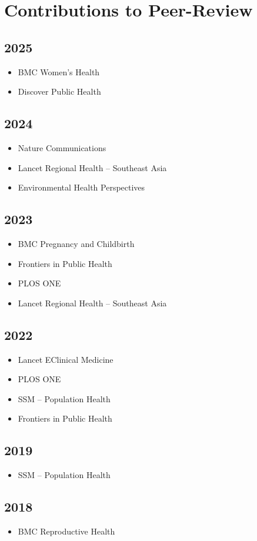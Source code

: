 \documentclass[13pt,letterpaper]{article}
\begin{document}
\section*{Contributions to Peer-Review}
\label{sec:org2a7861e}

\subsection*{2025}
\label{sec:org79f182d}
\begin{itemize}
\item BMC Women's Health
\item Discover Public Health 
\end{itemize}
\subsection*{2024}
\label{sec:orgb88952f}
\begin{itemize}
\item Nature Communications
\item Lancet Regional Health – Southeast Asia
\item Environmental Health Perspectives 
\end{itemize}
\subsection*{2023}
\label{sec:org96c805a}
\begin{itemize}
\item BMC Pregnancy and Childbirth
\item Frontiers in Public Health
\item PLOS ONE
\item Lancet Regional Health – Southeast Asia 
\end{itemize}
\subsection*{2022}
\label{sec:org42bb808}
\begin{itemize}
\item Lancet EClinical Medicine
\item PLOS ONE
\item SSM – Population Health
\item Frontiers in Public Health 
\end{itemize}
\subsection*{2019}
\label{sec:org6b2f754}
\begin{itemize}
\item SSM – Population Health 
\end{itemize}
\subsection*{2018}
\label{sec:org8b6ea79}
\begin{itemize}
\item BMC Reproductive Health 
\end{itemize}
\end{document}
